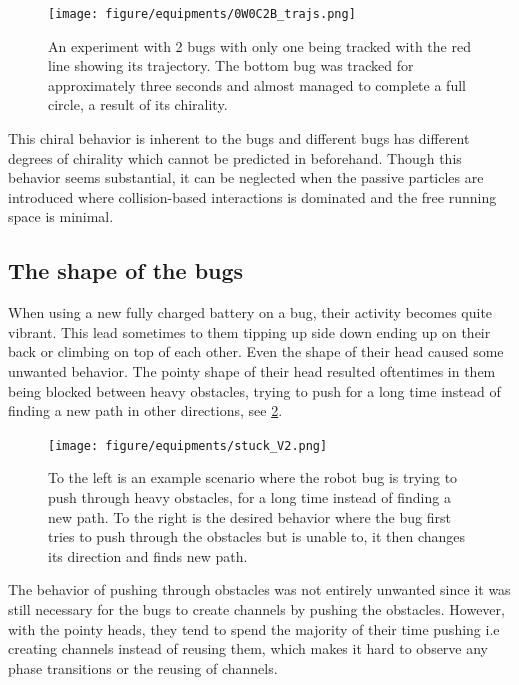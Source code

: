 \begin{figure}[htpb!]
    \centering
    \texttt{[image: figure/equipments/0W0C2B\_trajs.png]}
    \caption{An experiment with 2 bugs with only one being tracked with the red line showing its trajectory. 
    The bottom bug was tracked for approximately three seconds and almost managed to complete a full circle, 
    a result of its chirality.}
    \label{fig:chirality}
\end{figure}

This chiral behavior is inherent to the bugs and different bugs has different degrees of chirality which 
cannot be predicted in beforehand. Though this behavior seems substantial, it can be neglected when 
the passive particles are introduced where collision-based interactions is dominated and the free running 
space is minimal.

\subsection{The shape of the bugs}

When using a new fully charged battery on a bug, their activity becomes quite vibrant. This lead
sometimes to them tipping up side down ending up on their back or climbing on top of each other. 
Even the shape of their head caused some unwanted behavior. The pointy shape of their head resulted oftentimes
in them being blocked between heavy obstacles, trying to push for a long time instead of finding a new path in 
other directions, see \cref{fig:stuck}.

\begin{figure}[htpb!]
    \centering
    \texttt{[image: figure/equipments/stuck\_V2.png]}
    \caption{To the left is an example scenario where the robot bug is trying to push through heavy obstacles, for a long time 
    instead of finding a new path. To the right is the desired behavior where the bug first tries to push through the obstacles 
    but is unable to, it then changes its direction and finds new path.}
    \label{fig:stuck}
\end{figure}

The behavior of pushing through obstacles was not entirely unwanted since it was still necessary for
the bugs to create channels by pushing the obstacles. However, with the pointy heads, they tend to 
spend the majority of their time pushing i.e creating channels instead of reusing them, which makes 
it hard to observe any phase transitions or the reusing of channels.

